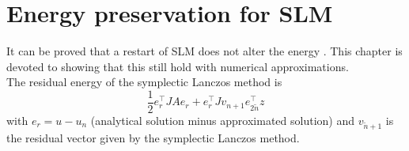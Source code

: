 \chapter{Energy preservation for SLM }
It can be proved that a restart of SLM does not alter the energy \cite{luli}. This chapter is devoted to showing that this still hold with numerical approximations. \\

The residual energy of the symplectic Lanczos method is
\begin{equation}
\frac{1}{2} e_r^{\top} J A e_r + e_r^\top J v_{n+1} e_{2\tilde{n}}^\top z
\end{equation}
with $ e_r = u-u_n $ (analytical solution minus approximated solution) and $v_{\tilde{n}+1}$ is the residual vector given by the symplectic Lanczos method. 


